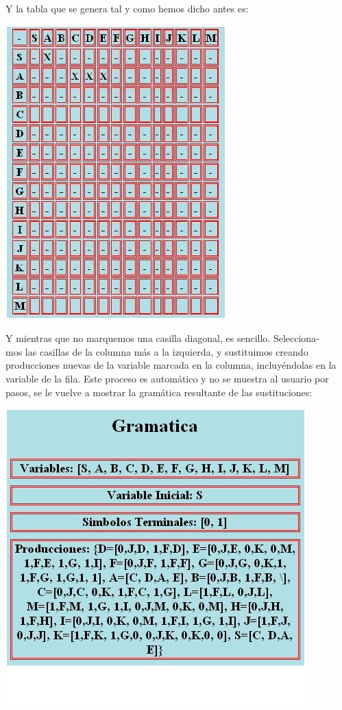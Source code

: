 \documentclass[12pt,a4paper,spanish]{book}
\begin{document}
Y la tabla que se genera tal y como hemos dicho antes es:
\newline
\begin{center}
\includegraphics[scale=0.5]{gram2.jpg}
\end{center}


Y mientras que no marquemos una casilla diagonal, es sencillo. Selecciona-\\mos las casillas de la columna m\'as a la izquierda, y sustituimos creando producciones nuevas de la variable marcada en la columna, incluy\'endolas en la variable de la fila. Este proceso es autom\'atico y no se muestra al usuario por pasos, se le vuelve a mostrar la gram\'atica resultante de las sustituciones:\\
\newline 
\begin{center}
\includegraphics[scale=0.6]{gram3.jpg}\\
\end{center}
\end{document}
